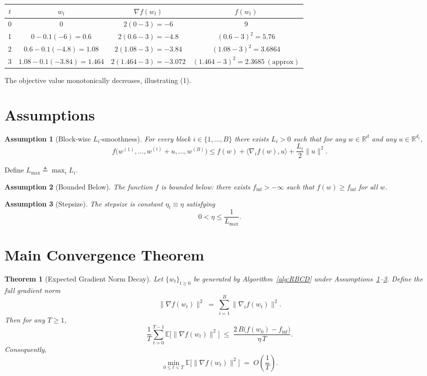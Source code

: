 \documentclass{article}
\newtheorem{theorem}{Theorem}
\newtheorem{assumption}{Assumption}
\begin{document}
\begin{center}
\begin{tabular}{c|c|c|c}
$t$ & $w_t$ & $\nabla f(w_t)$ & $f(w_t)$\\ \hline
0 & $0$ & $2(0-3)=-6$ & $9$\\
1 & $0-0.1(-6)=0.6$ & $2(0.6-3)=-4.8$ & $(0.6-3)^2=5.76$\\
2 & $0.6-0.1(-4.8)=1.08$ & $2(1.08-3)=-3.84$ & $(1.08-3)^2=3.6864$\\
3 & $1.08-0.1(-3.84)=1.464$ & $2(1.464-3)=-3.072$ & $(1.464-3)^2=2.3685\ (\text{approx})$
\end{tabular}
\end{center}
The objective value monotonically decreases, illustrating (1).

\newpage
\section*{Assumptions}
\begin{assumption}[Block‑wise $L_i$‑smoothness]\label{ass:smooth}
For every block $i\in\{1,\dots ,B\}$ there exists $L_i>0$ such that for any $w\in\mathbb{R}^d$ and any $u\in\mathbb{R}^{d_i}$,
\[
f\bigl(w^{(1)},\dots ,w^{(i)}+u,\dots ,w^{(B)}\bigr)
\le
f(w) + \langle \nabla_i f(w),u\rangle + \frac{L_i}{2}\|u\|^2 .
\tag{2}
\]
\end{assumption}
Define $L_{\max}\triangleq\max_{i}L_i$.

\begin{assumption}[Bounded Below]\label{ass:lower}
The function $f$ is bounded below: there exists $f_{\inf}>-\infty$ such that $f(w)\ge f_{\inf}$ for all $w$.
\end{assumption}

\begin{assumption}[Stepsize]\label{ass:stepsize}
The stepsize is constant $\eta_t\equiv\eta$ satisfying
\[
0<\eta\le \frac{1}{L_{\max}} .
\tag{3}
\]
\end{assumption}

\section*{Main Convergence Theorem}
\begin{theorem}[Expected Gradient Norm Decay]\label{thm:main}
Let $\{w_t\}_{t\ge0}$ be generated by Algorithm~\ref{alg:RBCD} under Assumptions~\ref{ass:smooth}--\ref{ass:stepsize}.  
Define the full gradient norm
\[
\|\nabla f(w_t)\|^2\;=\;\sum_{i=1}^{B}\|\nabla_i f(w_t)\|^2 .
\]
Then for any $T\ge1$,
\[
\frac{1}{T}\sum_{t=0}^{T-1}\mathbb{E}\!\bigl[\|\nabla f(w_t)\|^2\bigr]
\;\le\;
\frac{2\,B\bigl(f(w_0)-f_{\inf}\bigr)}{\eta\,T}.
\tag{4}
\]
Consequently,
\[
\min_{0\le t<T}\mathbb{E}\!\bigl[\|\nabla f(w_t)\|^2\bigr]\;=\;O\!\left(\frac{1}{T}\right).
\]
\end{theorem}
\end{document}

